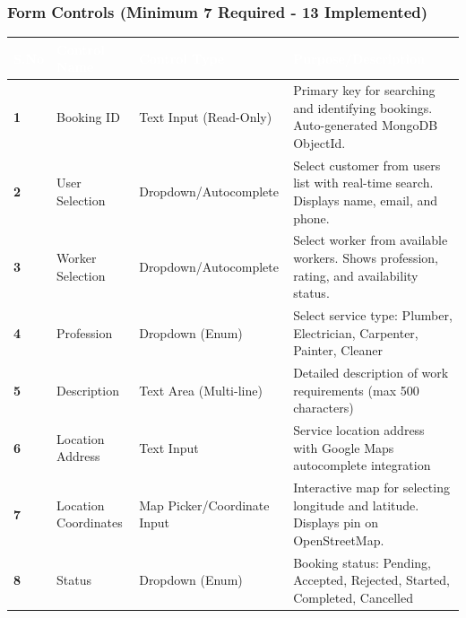 \documentclass[12pt,a4paper]{article}
\begin{document}
\subsubsection*{Form Controls (Minimum 7 Required - 13 Implemented)}

\begin{table}[H]
\centering
\renewcommand{\arraystretch}{1.8}
\begin{tabularx}{\textwidth}{|>{\centering\arraybackslash}p{1cm}|p{4.5cm}|p{3cm}|X|}
\hline
\rowcolor{headerblue}
\textcolor{white}{\textbf{S.No}} & \textcolor{white}{\textbf{Control Name}} & \textcolor{white}{\textbf{Control Type}} & \textcolor{white}{\textbf{Purpose/Description}} \\
\hline

\rowcolor{lightgray}
\textbf{1} & Booking ID & Text Input (Read-Only) & Primary key for searching and identifying bookings. Auto-generated MongoDB ObjectId. \\
\hline

\textbf{2} & User Selection & Dropdown/Autocomplete & Select customer from users list with real-time search. Displays name, email, and phone. \\
\hline

\rowcolor{lightgray}
\textbf{3} & Worker Selection & Dropdown/Autocomplete & Select worker from available workers. Shows profession, rating, and availability status. \\
\hline

\textbf{4} & Profession & Dropdown (Enum) & Select service type: Plumber, Electrician, Carpenter, Painter, Cleaner \\
\hline

\rowcolor{lightgray}
\textbf{5} & Description & Text Area (Multi-line) & Detailed description of work requirements (max 500 characters) \\
\hline

\textbf{6} & Location Address & Text Input & Service location address with Google Maps autocomplete integration \\
\hline

\rowcolor{lightgray}
\textbf{7} & Location Coordinates & Map Picker/Coordinate Input & Interactive map for selecting longitude and latitude. Displays pin on OpenStreetMap. \\
\hline

\textbf{8} & Status & Dropdown (Enum) & Booking status: Pending, Accepted, Rejected, Started, Completed, Cancelled \\
\hline


\end{tabularx}
\end{table}
\end{document}
